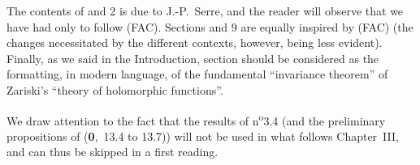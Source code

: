 The contents of \textsection{} and 2 is due to J.-P.~Serre, and the reader will observe that we have had only to follow (FAC).
Sections  and 9 are equally inspired by (FAC) (the changes necessitated by the different contexts, however, being less evident).
Finally, as we said in the Introduction, section  should be considered as the formatting, in modern language, of the fundamental ``invariance theorem'' of Zariski's ``theory of holomorphic functions''.

We draw attention to the fact that the results of n\textsuperscript{o}3.4 (and the preliminary propositions of (\textbf{0},~13.4 to 13.7)) will not be used in what follows Chapter~III, and can thus be skipped in a first reading.
\bigskip














